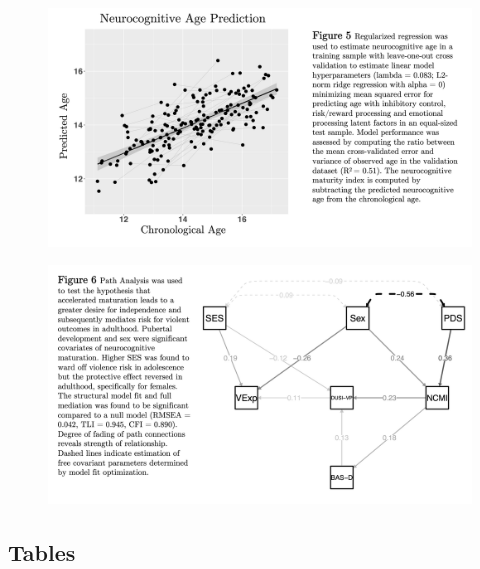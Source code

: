 \documentclass[utf8]{frontiersSCNS} %
\begin{document}
\begin{figure}[h!]
\includegraphics[width=\textwidth,height=\textheight,keepaspectratio]{Fig-5}
\caption{}
\label{fig:5}
\end{figure}

\begin{figure}[h!]
\includegraphics[width=\textwidth,height=\textheight,keepaspectratio]{Fig-6}
\caption{}
\label{fig:6}
\end{figure}

\newpage
\subsection{Tables}
\newpage

\end{document}
